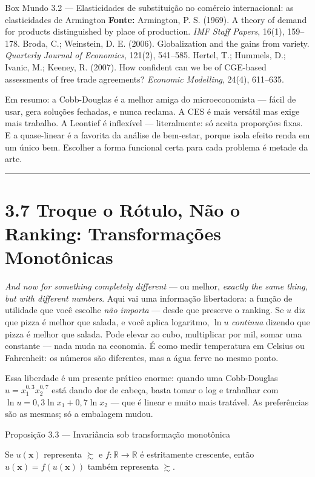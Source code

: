\documentclass[11pt,twoside,openright]{book}
\begin{document}
\begin{boxmundobox}{Box Mundo 3.2 — Elasticidades de substituição no comércio internacional: as elasticidades de Armington}
\textbf{Fonte:} Armington, P. S. (1969). A theory of demand for products
distinguished by place of production. \emph{IMF Staff Papers}, 16(1),
159--178. Broda, C.; Weinstein, D. E. (2006). Globalization and the
gains from variety. \emph{Quarterly Journal of Economics}, 121(2),
541--585. Hertel, T.; Hummels, D.; Ivanic, M.; Keeney, R. (2007). How
confident can we be of CGE-based assessments of free trade agreements?
\emph{Economic Modelling}, 24(4), 611--635.

\end{boxmundobox}

Em resumo: a Cobb-Douglas é a melhor amiga do microeconomista --- fácil
de usar, gera soluções fechadas, e nunca reclama. A CES é mais versátil
mas exige mais trabalho. A Leontief é inflexível --- literalmente: só
aceita proporções fixas. E a quase-linear é a favorita da análise de
bem-estar, porque isola efeito renda em um único bem. Escolher a forma
funcional certa para cada problema é metade da arte.

\begin{center}\rule{0.5\linewidth}{0.5pt}\end{center}

\section{3.7 Troque o Rótulo, Não o Ranking: Transformações
Monotônicas}\label{troque-o-ruxf3tulo-nuxe3o-o-ranking-transformauxe7uxf5es-monotuxf4nicas}

\emph{And now for something completely different} --- ou melhor,
\emph{exactly the same thing, but with different numbers}. Aqui vai uma
informação libertadora: a função de utilidade que você escolhe \emph{não
importa} --- desde que preserve o ranking. Se \(u\) diz que pizza é
melhor que salada, e você aplica logaritmo, \(\ln u\) \emph{continua}
dizendo que pizza é melhor que salada. Pode elevar ao cubo, multiplicar
por mil, somar uma constante --- nada muda na economia. É como medir
temperatura em Celsius ou Fahrenheit: os números são diferentes, mas a
água ferve no mesmo ponto.

Essa liberdade é um presente prático enorme: quando uma Cobb-Douglas
\(u = x_1^{0{,}3} x_2^{0{,}7}\) está dando dor de cabeça, basta tomar o
log e trabalhar com \(\ln u = 0{,}3 \ln x_1 + 0{,}7 \ln x_2\) --- que é
linear e muito mais tratável. As preferências são as mesmas; só a
embalagem mudou.

\begin{theorembox}{Proposição 3.3 — Invariância sob transformação monotônica}

Se \(u(\mathbf{x})\) representa \(\succsim\) e
\(f: \mathbb{R} \to \mathbb{R}\) é estritamente crescente, então
\(\hat{u}(\mathbf{x}) = f(u(\mathbf{x}))\) também representa
\(\succsim\).

\end{theorembox}
\end{document}
